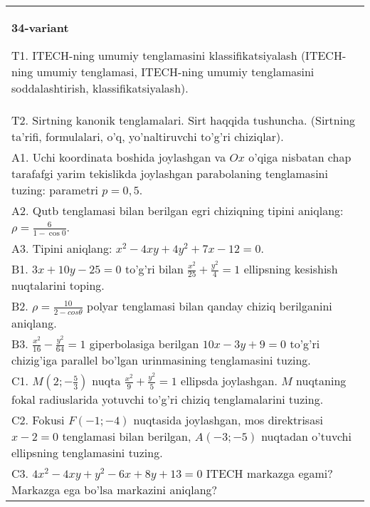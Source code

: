 \documentclass{article}
\begin{document}
\begin{tabular}{m{17cm}}
\textbf{34-variant}
\newline

T1. ITECH-ning umumiy tenglamasini klassifikatsiyalash (ITECH-ning umumiy tenglamasi, ITECH-ning umumiy tenglamasini soddalashtirish, klassifikatsiyalash).\\

T2. Sirtning kanonik tenglamalari. Sirt haqqida tushuncha. (Sirtning ta'rifi, formulalari, o'q, yo'naltiruvchi to'g'ri chiziqlar).\\

A1. Uchi koordinata boshida joylashgan va $Ox$ o'qiga nisbatan chap tarafafgi yarim tekislikda joylashgan parabolaning tenglamasini tuzing: parametri $p=0,5$.\\

A2. Qutb tenglamasi bilan berilgan egri chiziqning tipini aniqlang: $\rho=\frac{6}{1-\cos 0}$.\\

A3. Tipini aniqlang: $x^{2}-4xy+4y^{2}+7x-12=0$.\\

B1. $3x + 10y - 25 = 0$ to'g'ri bilan $\frac{x^{2}}{25} + \frac{y^{2}}{4} = 1$ ellipsning kesishish nuqtalarini toping.  \\

B2. $\rho = \frac{10}{2 - cos\theta}$ polyar tenglamasi bilan qanday chiziq berilganini aniqlang.  \\

B3. $\frac{x^{2}}{16} - \frac{y^{2}}{64} = 1$ giperbolasiga berilgan $10x - 3y + 9 = 0$ to'g'ri chizig'iga parallel bo'lgan urinmasining tenglamasini tuzing.  \\

C1. $M(2; - \frac{5}{3})$ nuqta $\frac{x^{2}}{9} + \frac{y^{2}}{5} = 1$ ellipsda joylashgan. $M$ nuqtaning fokal radiuslarida yotuvchi to'g'ri chiziq tenglamalarini tuzing.  \\

C2. Fokusi $F( - 1; - 4)$ nuqtasida joylashgan, mos direktrisasi $x - 2 = 0$ tenglamasi bilan berilgan, $A( - 3; - 5)$ nuqtadan o'tuvchi ellipsning tenglamasini tuzing.  \\

C3. $4x^{2} - 4xy + y^{2} - 6x + 8y + 13 = 0$ ITECH markazga egami? Markazga ega bo'lsa markazini aniqlang?  \\

\end{tabular}
\vspace{1cm}
\end{document}
